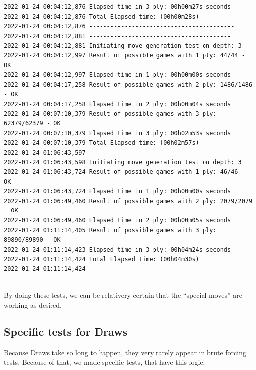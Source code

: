 \documentclass[10pt]{article}
\begin{document}
\begin{lstlisting}
2022-01-24 00:04:12,876 Elapsed time in 3 ply: 00h00m27s seconds
2022-01-24 00:04:12,876 Total Elapsed time: (00h00m28s)
2022-01-24 00:04:12,876 -----------------------------------------
2022-01-24 00:04:12,881 ----------------------------------------
2022-01-24 00:04:12,881 Initiating move generation test on depth: 3
2022-01-24 00:04:12,997 Result of possible games with 1 ply: 44/44 - OK
2022-01-24 00:04:12,997 Elapsed time in 1 ply: 00h00m00s seconds
2022-01-24 00:04:17,258 Result of possible games with 2 ply: 1486/1486 - OK
2022-01-24 00:04:17,258 Elapsed time in 2 ply: 00h00m04s seconds
2022-01-24 00:07:10,379 Result of possible games with 3 ply: 62379/62379 - OK
2022-01-24 00:07:10,379 Elapsed time in 3 ply: 00h02m53s seconds
2022-01-24 00:07:10,379 Total Elapsed time: (00h02m57s)
2022-01-24 01:06:43,597 ----------------------------------------
2022-01-24 01:06:43,598 Initiating move generation test on depth: 3
2022-01-24 01:06:43,724 Result of possible games with 1 ply: 46/46 - OK
2022-01-24 01:06:43,724 Elapsed time in 1 ply: 00h00m00s seconds
2022-01-24 01:06:49,460 Result of possible games with 2 ply: 2079/2079 - OK
2022-01-24 01:06:49,460 Elapsed time in 2 ply: 00h00m05s seconds
2022-01-24 01:11:14,405 Result of possible games with 3 ply: 89890/89890 - OK
2022-01-24 01:11:14,423 Elapsed time in 3 ply: 00h04m24s seconds
2022-01-24 01:11:14,424 Total Elapsed time: (00h04m30s)
2022-01-24 01:11:14,424 -----------------------------------------
    
\end{lstlisting}

By doing these tests, we can be relativery certain that the ``special moves'' are working
as desired.

\subsection{Specific tests for Draws}

Because Draws take so long to happen, they very rarely appear in brute forcing
tests. Because of that, we made specific tests, that have this logic:
\end{document}
